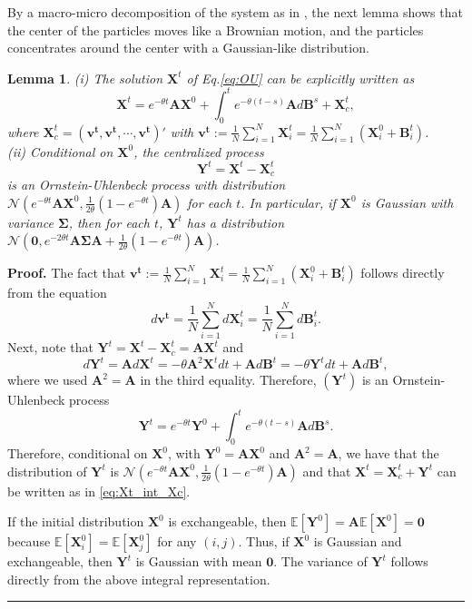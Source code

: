 \documentclass[]{elsarticle}
\def\E{\mathbb{E}}
\def\thetaOU{\theta}
\newcommand{\mbf}[1]{\boldsymbol{#1}}
\newcommand{\bB}{\mbf{B}}
\newcommand{\bX}{\mbf{X}}
\newcommand{\bY}{\mbf{Y}}
\newcommand{\btheta}{\mbf{A}}
\newtheorem{lemma}[theorem]{Lemma}
\newenvironment{proof}[1][Proof]{\noindent\textbf{#1.} }{\ \rule{0.5em}{0.5em}}
\numberwithin{equation}{section}
\numberwithin{theorem}{section}
\begin{document}
By a macro-micro decomposition of the system as in   \cite{malrieu2003convergence,cattiaux2018stochastic}, 
the next lemma shows that the center of the particles moves like a Brownian motion, and the particles concentrates around the center with a Gaussian-like distribution. 
\begin{lemma}\label{leamm:Linear}
(i)
The solution $\bX^t$ of Eq.\eqref{eq:OU} can be explicitly written as 
\begin{equation}\label{eq:Xt_int_Xc}
\bX^t = e^{-\thetaOU t} \btheta \bX^0 +  \int_0^t  e^{-\thetaOU (t-s)}\btheta d\bB^s + \bX_c^t,
\end{equation}
where $\bX_c^t= (\mathbf{v^t,v^t,\cdots, v^t})'$ with $\mathbf{v^t}:=\frac{1}{N}\sum_{i=1}^N \bX_i^t= \frac{1}{N}\sum_{i=1}^N (\bX_i^0+\bB_i^t)$.\\
(ii) Conditional on $\bX^0$, the centralized process 
\[ \bY^t= \bX^t- \bX_c^t
\]
 is an Ornstein-Uhlenbeck process with distribution $\mathcal{N}\left(e^{-\thetaOU t} \btheta\bX^0, \frac{1}{2\thetaOU}(1-e^{-\thetaOU t})\btheta \right)$ for each $t$. In particular, if $\bX^0$ is Gaussian with variance $\mbf\Sigma$, then for each $t$, $\bY^t$ has a  distribution $\mathcal{N}\left(\mathbf{0},e^{-2\theta t}\btheta\mbf\Sigma \btheta+ \frac{1}{2\thetaOU}(1-e^{-\thetaOU t})\btheta \right)$.
\end{lemma}
\begin{proof}
The fact that $\mathbf{v^t}:=\frac{1}{N}\sum_{i=1}^N \bX_i^t = \frac{1}{N}\sum_{i=1}^N (\bX_i^0+\bB_i^t)$ follows directly from the equation
\[d\mathbf{v^t} = \frac{1}{N}\sum_{i=1}^N d\bX_i^t = \frac{1}{N}\sum_{i=1}^N d\bB_i^t.\]
Next, note that $\bY^t= \bX^t- \bX_c^t = \btheta\bX^t$ and 
\[
d\bY^t = \btheta d\bX^t = -\thetaOU \btheta^2 \bX^tdt +  \btheta d\bB^t = -\thetaOU \bY^tdt +  \btheta d\bB^t , \]
where we used $\btheta^2 =\btheta $ in the third equality.
Therefore, $(\bY^t)$ is an Ornstein-Uhlenbeck process 
\[
\bY^t = e^{-\thetaOU t}\bY^0 +  \int_0^t e^{-\thetaOU (t-s)}\btheta d\bB^s.
\]
Therefore, conditional on $\bX^0$, with $\bY^0=\btheta \bX^0$ and $\btheta^2=\btheta$, we have that  the distribution of $\bY^t$ is $\mathcal{N}\left(e^{-\thetaOU t} \btheta\bX^0, \frac{1}{2\thetaOU}(1-e^{-\thetaOU t})\btheta \right)$ and that $\bX^t= \bX_c^t+ \bY^t$ can be written as in \eqref{eq:Xt_int_Xc}.


 If the initial distribution $\bX^0$ is exchangeable, then $\E[\bY^0]=\btheta\E[\bX^0]=\mathbf{0}$ because $\E[\bX_i^0]=\E[\bX_j^0]$ for any $(i,j)$. Thus, if  $\bX^0$ is Gaussian and exchangeable, then $\bY^t$ is Gaussian with mean $\mathbf{0}$. The variance of $\bY^t$ follows directly from the above integral representation. 
\end{proof}
\end{document}

